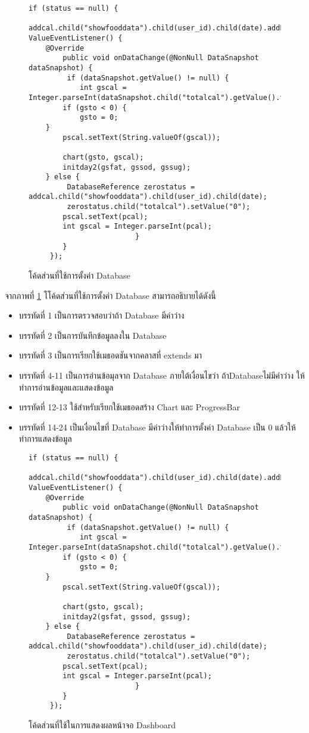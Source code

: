 	\begin{figure}[H]
		{\begin{lstlisting}
if (status == null) {
 addcal.child("showfooddata").child(user_id).child(date).addListenerForSingleValueEvent(new ValueEventListener() {
	@Override
		public void onDataChange(@NonNull DataSnapshot dataSnapshot) {
		 if (dataSnapshot.getValue() != null) {
			int gscal = Integer.parseInt(dataSnapshot.child("totalcal").getValue().toString());
		if (gsto < 0) {
		    gsto = 0;
	}
		pscal.setText(String.valueOf(gscal));

		chart(gsto, gscal);
		initday2(gsfat, gssod, gssug);
	} else {
		 DatabaseReference zerostatus = addcal.child("showfooddata").child(user_id).child(date);
		 zerostatus.child("totalcal").setValue("0");
		pscal.setText(pcal);
		int gscal = Integer.parseInt(pcal);
						 }
		}
	 });
	 \end{lstlisting}}
		\caption{โค้ดส่วนที่ใช้การตั้งค่า Database}
		\label{Fig:Dashbordset}
	\end{figure}
	\newpage
	จากภาพที่ \ref{Fig:Dashbordset} โโค้ดส่วนที่ใช้การตั้งค่า Database สามารถอธิบายได้ดังนี้
	\begin{itemize}[label={--}]
		\item บรรทัดที่ 1  เป็นการตรวจสอบว่าถ้า Database มีค่าว่าง
		\item บรรทัดที่ 2  เป็นการบันทึกข้อมูลลงใน Database 
		\item บรรทัดที่ 3  เป็นการเรียกใช้เมธอดชันจากคลาสที่ extends มา
		\item บรรทัดที่ 4-11 เป็นการอ่านข้อมุลจาก Database ภายใต้เงื่อนไขว่า ถ้าDatabaseไม่มีค่าว่าง ให้ทำการอ่านข้อมูลและแสดงข้อมูล
		\item บรรทัดที่ 12-13  ใช้สำหรับเรียกใช้เมธอดสร้าง Chart และ ProgressBar 
		\item บรรทัดที่ 14-24 เป็นเงื่อนไขที่ Database มีค่าว่างให้ทำการตั้งค่า Database เป็น 0 แล้วให้ทำการแสดงข้อมูล
	\end{itemize}
		\begin{figure}[H]
		{\begin{lstlisting}
if (status == null) {
 addcal.child("showfooddata").child(user_id).child(date).addListenerForSingleValueEvent(new ValueEventListener() {
	@Override
		public void onDataChange(@NonNull DataSnapshot dataSnapshot) {
		 if (dataSnapshot.getValue() != null) {
			int gscal = Integer.parseInt(dataSnapshot.child("totalcal").getValue().toString());
		if (gsto < 0) {
		    gsto = 0;
	}
		pscal.setText(String.valueOf(gscal));

		chart(gsto, gscal);
		initday2(gsfat, gssod, gssug);
	} else {
		 DatabaseReference zerostatus = addcal.child("showfooddata").child(user_id).child(date);
		 zerostatus.child("totalcal").setValue("0");
		pscal.setText(pcal);
		int gscal = Integer.parseInt(pcal);
						 }
		}
	 });
	 \end{lstlisting}}
		\caption{โค้ดส่วนที่ใช้ในการแสดงผลหน้าจอ Dashboard}
		\label{Fig:Dashbordset2}
	\end{figure}
